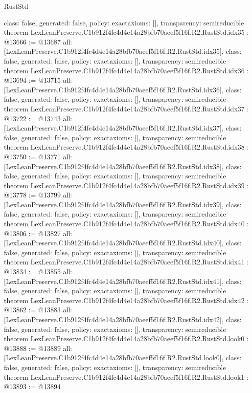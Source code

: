 \begin{lexlean}{RustStd}
\begin{coremodule}
{  class: false,
  generated: false,
  policy: exact{axioms: []},
  transparency: semireducible
}
theorem LexLeanPreserve.C1b912f4fc4d4e14a28bfb70aeef5f16f.R2.RustStd.idx35 : @13666 := @13687 {
  all: [LexLeanPreserve.C1b912f4fc4d4e14a28bfb70aeef5f16f.R2.RustStd.idx35],
  class: false,
  generated: false,
  policy: exact{axioms: []},
  transparency: semireducible
}
theorem LexLeanPreserve.C1b912f4fc4d4e14a28bfb70aeef5f16f.R2.RustStd.idx36 : @13694 := @13715 {
  all: [LexLeanPreserve.C1b912f4fc4d4e14a28bfb70aeef5f16f.R2.RustStd.idx36],
  class: false,
  generated: false,
  policy: exact{axioms: []},
  transparency: semireducible
}
theorem LexLeanPreserve.C1b912f4fc4d4e14a28bfb70aeef5f16f.R2.RustStd.idx37 : @13722 := @13743 {
  all: [LexLeanPreserve.C1b912f4fc4d4e14a28bfb70aeef5f16f.R2.RustStd.idx37],
  class: false,
  generated: false,
  policy: exact{axioms: []},
  transparency: semireducible
}
theorem LexLeanPreserve.C1b912f4fc4d4e14a28bfb70aeef5f16f.R2.RustStd.idx38 : @13750 := @13771 {
  all: [LexLeanPreserve.C1b912f4fc4d4e14a28bfb70aeef5f16f.R2.RustStd.idx38],
  class: false,
  generated: false,
  policy: exact{axioms: []},
  transparency: semireducible
}
theorem LexLeanPreserve.C1b912f4fc4d4e14a28bfb70aeef5f16f.R2.RustStd.idx39 : @13778 := @13799 {
  all: [LexLeanPreserve.C1b912f4fc4d4e14a28bfb70aeef5f16f.R2.RustStd.idx39],
  class: false,
  generated: false,
  policy: exact{axioms: []},
  transparency: semireducible
}
theorem LexLeanPreserve.C1b912f4fc4d4e14a28bfb70aeef5f16f.R2.RustStd.idx40 : @13806 := @13827 {
  all: [LexLeanPreserve.C1b912f4fc4d4e14a28bfb70aeef5f16f.R2.RustStd.idx40],
  class: false,
  generated: false,
  policy: exact{axioms: []},
  transparency: semireducible
}
theorem LexLeanPreserve.C1b912f4fc4d4e14a28bfb70aeef5f16f.R2.RustStd.idx41 : @13834 := @13855 {
  all: [LexLeanPreserve.C1b912f4fc4d4e14a28bfb70aeef5f16f.R2.RustStd.idx41],
  class: false,
  generated: false,
  policy: exact{axioms: []},
  transparency: semireducible
}
theorem LexLeanPreserve.C1b912f4fc4d4e14a28bfb70aeef5f16f.R2.RustStd.idx42 : @13862 := @13883 {
  all: [LexLeanPreserve.C1b912f4fc4d4e14a28bfb70aeef5f16f.R2.RustStd.idx42],
  class: false,
  generated: false,
  policy: exact{axioms: []},
  transparency: semireducible
}
theorem LexLeanPreserve.C1b912f4fc4d4e14a28bfb70aeef5f16f.R2.RustStd.look0 : @13888 := @13889 {
  all: [LexLeanPreserve.C1b912f4fc4d4e14a28bfb70aeef5f16f.R2.RustStd.look0],
  class: false,
  generated: false,
  policy: exact{axioms: []},
  transparency: semireducible
}
theorem LexLeanPreserve.C1b912f4fc4d4e14a28bfb70aeef5f16f.R2.RustStd.look1 : @13893 := @13894 {
}
\end{coremodule}
\end{lexlean}
